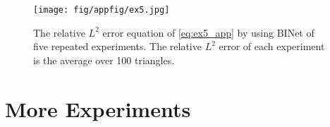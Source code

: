 \documentclass[hyperref]{article}
\numberwithin{equation}{section}
\theoremstyle{nonumberplain}
\begin{document}
	
	
	
	\begin{figure}[t]
		\centering
		\centering
		\texttt{[image: fig/appfig/ex5.jpg]}
		\centering
		\caption{The relative $L^2$ error equation of \eqref{eq:ex5_app} by using BINet of five repeated experiments. The relative $L^2$ error of each experiment is the average over 100 triangles.}
		\label{fig:app5}
	\end{figure}
	
	\section{More Experiments}
	
\end{document}
